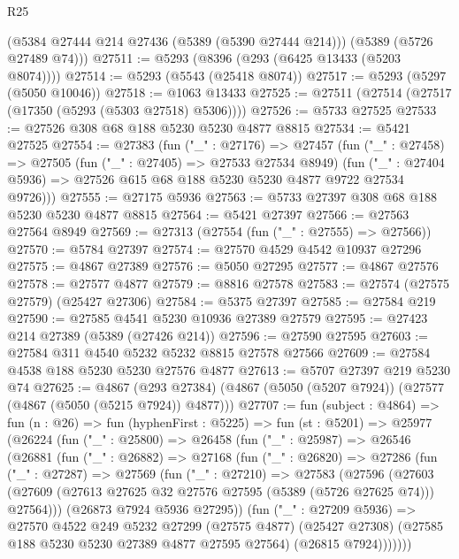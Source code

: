 \begin{lexlean}{R25}
\begin{coremodule}
      (@5384 @27444 @214 @27436 (@5389 (@5390 @27444 @214)))
      (@5389 (@5726 @27489 @74)))
@27511 := @5293 (@8396 (@293 (@6425 @13433 (@5203 @8074))))
@27514 := @5293 (@5543 (@25418 @8074))
@27517 := @5293 (@5297 (@5050 @10046))
@27518 := @1063 @13433
@27525 := @27511 (@27514 (@27517 (@17350 (@5293 (@5303 @27518) @5306))))
@27526 := @5733 @27525
@27533 := @27526 @308 @68 @188 @5230 @5230 @4877 @8815
@27534 := @5421 @27525
@27554 := @27383
    (fun ("_" : @27176) =>
    @27457
      (fun ("_" : @27458) =>
      @27505
        (fun ("_" : @27405) => @27533 @27534 @8949)
        (fun ("_" : @27404 @5936) => @27526 @615 @68 @188 @5230 @5230 @4877 @9722 @27534 @9726)))
@27555 := @27175 @5936
@27563 := @5733 @27397 @308 @68 @188 @5230 @5230 @4877 @8815
@27564 := @5421 @27397
@27566 := @27563 @27564 @8949
@27569 := @27313 (@27554 (fun ("_" : @27555) => @27566))
@27570 := @5784 @27397
@27574 := @27570 @4529 @4542 @10937 @27296
@27575 := @4867 @27389
@27576 := @5050 @27295
@27577 := @4867 @27576
@27578 := @27577 @4877
@27579 := @8816 @27578
@27583 := @27574 (@27575 @27579) (@25427 @27306)
@27584 := @5375 @27397
@27585 := @27584 @219
@27590 := @27585 @4541 @5230 @10936 @27389 @27579
@27595 := @27423 @214 @27389 (@5389 (@27426 @214))
@27596 := @27590 @27595
@27603 := @27584 @311 @4540 @5232 @5232 @8815 @27578 @27566
@27609 := @27584 @4538 @188 @5230 @5230 @27576 @4877
@27613 := @5707 @27397 @219 @5230 @74
@27625 := @4867
    (@293 @27384)
    (@4867 (@5050 (@5207 @7924)) (@27577 (@4867 (@5050 (@5215 @7924)) @4877)))
@27707 := fun (subject : @4864) =>
  fun (n : @26) =>
  fun (hyphenFirst : @5225) =>
  fun (st : @5201) =>
  @25977
    (@26224
      (fun ("_" : @25800) =>
      @26458
        (fun ("_" : @25987) =>
        @26546
          (@26881
            (fun ("_" : @26882) =>
            @27168
              (fun ("_" : @26820) =>
              @27286
                (fun ("_" : @27287) =>
                @27569
                  (fun ("_" : @27210) =>
                  @27583
                    (@27596
                      (@27603
                        (@27609
                          (@27613 @27625 @32 @27576 @27595 (@5389 (@5726 @27625 @74)))
                          @27564)))
                    (@26873 @7924 @5936 @27295))
                  (fun ("_" : @27209 @5936) =>
                  @27570
                    @4522
                    @249
                    @5232
                    @27299
                    (@27575 @4877)
                    (@25427 @27308)
                    (@27585 @188 @5230 @5230 @27389 @4877 @27595 @27564)
                    (@26815 @7924)))))))

\end{coremodule}
\end{lexlean}

